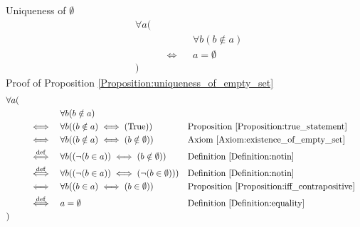 \begin{prop}
\label{Proposition:uniqueness_of_empty_set}
Uniqueness of $\emptyset$
\begin{align*}
& \forall a ( \\
& \quad && && \forall b (b \notin a) \\
& \quad && \iff && a = \emptyset \\
& )
\end{align*}
Proof of Proposition \ref{Proposition:uniqueness_of_empty_set}
\begin{align*}
& \forall a ( \\
& \quad && && \forall b (b \notin a) \\
& \quad && \iff && \forall b ((b \notin a) \iff (\text{True}))
&& \text{Proposition \ref{Proposition:true_statement}} \\
& \quad && \iff && \forall b ((b \notin a) \iff (b \notin \emptyset))
&& \text{Axiom \ref{Axiom:existence_of_empty_set}} \\
& \quad && \overset{\operatorname{def}}{\iff} && \forall b ((\lnot (b \in a)) \iff (b \notin \emptyset))
&& \text{Definition \ref{Definition:notin}} \\
& \quad && \overset{\operatorname{def}}{\iff} && \forall b ((\lnot (b \in a)) \iff (\lnot (b \in \emptyset)))
&& \text{Definition \ref{Definition:notin}} \\
& \quad && \iff && \forall b ((b \in a) \iff (b \in \emptyset))
&& \text{Proposition \ref{Proposition:iff_contrapositive}} \\
& \quad && \overset{\operatorname{def}}{\iff} && a = \emptyset
&& \text{Definition \ref{Definition:equality}} \\
& )
\end{align*}
\end{prop}

